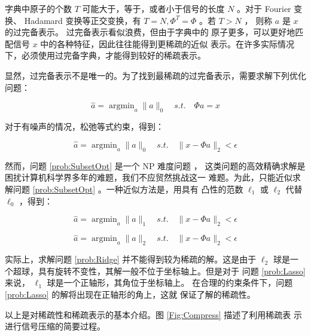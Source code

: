 字典中原子的个数 $T$ 可能大于，等于，或者小于信号的长度 $N$ 。对于 Fourier
变换、 Hadamard 变换等正交变换，有 $T = N, \Phi^T = \Phi$ 。若 $T > N$ ，
则称 $a$ 是 $x$ 的过完备表示。 过完备表示看似浪费，但由于字典中的
原子更多，可以更好地匹配信号 $x$ 中的各种特征，因此往往能得到更稀疏的近似
表示。在许多实际情况下，必须使用过完备字典，才能得到较好的稀疏表示。

显然，过完备表示不是唯一的。为了找到最稀疏的过完备表示，需要求解下列优化
问题：
\begin{problem}
\begin{equation}
\hat a = \mathop{\arg\min}_a \|a\|_0 \quad s.t. \quad \Phi a = x
\end{equation}
\end{problem}
对于有噪声的情况，松弛等式约束，得到：
\begin{problem}[子集最优化问题] \label{prob:SubsetOpt}
\begin{equation}
\hat a = \mathop{\arg\min}_a  \|a\|_0 \quad s.t. \quad \|x - \Phi a\|_2 < \epsilon
\end{equation}
\end{problem}
然而，问题 \ref{prob:SubsetOpt} 是一个 NP 难度问题 \cite{GJ79, SubsetOptNPC}，
这类问题的高效精确求解是困扰计算机科学界多年的难题，我们不应贸然挑战这一
难题。为此，只能近似求解问题 \ref{prob:SubsetOpt} 。一种近似方法是，用具有
凸性的范数 $\ell_1$ 或 $\ell_2$ 代替 $\ell_0$ ，得到：
\begin{problem} \label{prob:Lasso}
\begin{equation} \label{eqn:Lasso}
\hat a = \mathop{\arg\min}_a \|a\|_1 \quad s.t. \quad \|x - \Phi a\|_2 < \epsilon
\end{equation}
\end{problem}
\begin{problem}[岭回归问题] \label{prob:Ridge}
\begin{equation}
\hat a = \mathop{\arg\min}_a \|a\|_2 \quad s.t. \quad \|x - \Phi a\|_2 < \epsilon
\end{equation}
\end{problem}
实际上，求解问题 \ref{prob:Ridge} 并不能得到较为稀疏的解。这是由于
$\ell_2$ 球是一个超球，具有旋转不变性，其解一般不位于坐标轴上。但是对于
问题 \ref{prob:Lasso} 来说， $\ell_1$ 球是一个正轴形，其角位于坐标轴上。
在合理的约束条件下，问题 \ref{prob:Lasso} 的解将出现在正轴形的角上，这就
保证了解的稀疏性。

以上是对稀疏性和稀疏表示的基本介绍。图 \ref{Fig:Compress} 描述了利用稀疏表
示进行信号压缩的简要过程。

